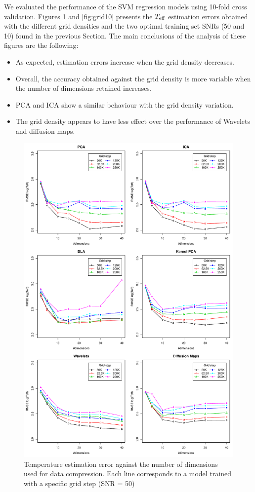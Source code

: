 \documentclass[a4paper,fleqn,usenatbib]{mnras}
\begin{document}
{{{We evaluated the performance of the SVM regression models using
10-fold cross validation. Figures \ref{fig:grid50} and
\ref{fig:grid10} presents the $T_{\rm eff}$ estimation errors obtained
with the different grid densities and the two optimal training set
SNRs (50 and 10) found in the previous Section. The main conclusions
of the analysis of these figures are the following:

\begin{itemize}
\item As expected, estimation errors increase when the grid 
	density decreases.
\item Overall, the accuracy obtained against the grid density 
	is more variable when the number of dimensions retained 
	increases. 
\item PCA and ICA show a similar behaviour with the grid density
  variation.
\item The grid density appears to have less effect over the
  performance of Wavelets and diffusion maps.
\end{itemize}

\begin{figure}
\centering\includegraphics[height=0.95\textheight]{bestSVM_Teff_N-RMSE_HR10_snr=50_all.pdf}
\caption{Temperature estimation error against the number of dimensions
  used for data compression. Each line corresponds to a model trained
  with a specific grid step (SNR = 50)}
\label{fig:grid50}
\end{figure}

}}}
\end{document}
